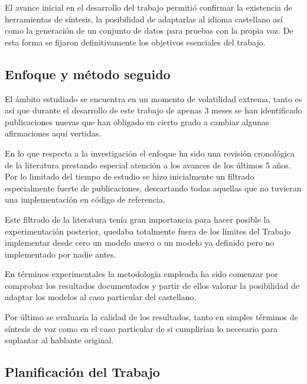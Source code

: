 El avance inicial en el desarrollo del trabajo permitió confirmar la existencia de herramientas de síntesis, la posibilidad de adaptarlas al idioma castellano así como la generación de un conjunto de datos para pruebas con la propia voz. De esta forma se fijaron definitivamente los objetivos esenciales del trabajo.

\subsection{Enfoque y método seguido}

El ámbito estudiado se encuentra en un momento de volatilidad extrema, tanto es así que durante el desarrollo de este trabajo de apenas 3 meses se han identificado publicaciones nuevas que han obligado en cierto grado a cambiar algunas afirmaciones aquí vertidas.

En lo que respecta a la investigación el enfoque ha sido una revisión cronológica de la literatura prestando especial atención a los avances de los últimos 5 años. Por lo limitado del tiempo de estudio se hizo inicialmente un filtrado especialmente fuerte de publicaciones, descartando todas aquellas que no tuvieran una implementación en código de referencia.

Este filtrado de la literatura tenía gran importancia para hacer posible la experimentación posterior, quedaba totalmente fuera de los límites del Trabajo implementar desde cero un modelo nuevo o un modelo ya definido pero no implementado por nadie antes.

En términos experimentales la metodología empleada ha sido comenzar por comprobar los resultados documentados y partir de ellos valorar la posibilidad de adaptar los modelos al caso particular del castellano.

Por último se evaluaría la calidad de los resultados, tanto en simples términos de síntesis de voz como en el caso particular de si cumplirían lo necesario para suplantar al hablante original.

\subsection{Planificación del Trabajo}


